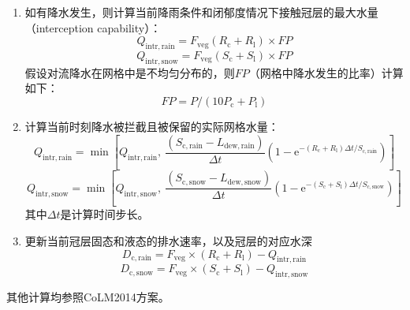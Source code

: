 \begin{enumerate}
\item 如有降水发生，则计算当前降雨条件和闭郁度情况下接触冠层的最大水量（interception capability）：
  \begin{equation}
    Q_{\mathrm{intr,rain}} =F_{\mathrm{veg}}\left(R_{\mathrm{c}}+R_{\mathrm{l}}\right)\times FP
  \end{equation}
  \begin{equation}
    Q_{\mathrm{intr,snow}} =F_{\mathrm{veg}}\left(S_{\mathrm{c}}+S_{\mathrm{l}}\right)\times FP
  \end{equation}
  假设对流降水在网格中是不均匀分布的，则$FP$（网格中降水发生的比率）计算如下：
  \begin{equation}
    FP = P/ (10P_{\mathrm{c}} + P_{\mathrm{l}})
  \end{equation}
\item 计算当前时刻降水被拦截且被保留的实际网格水量：
  \begin{equation}
    Q_{\mathrm{intr,rain}} = \min\left[Q_{\mathrm{intr,rain}}, \ \frac{(S_{\mathrm{c,rain}} - L_{\mathrm{dew,rain}})}{\Delta{t}}  (1-{\mathrm e}^{-\left(R_{\mathrm{c}}+R_{\mathrm{l}}\right)\Delta{t}/S_{\mathrm{c,rain}}})\right]
  \end{equation}
  \begin{equation}
    Q_{\mathrm{intr,snow}} = \min\left[Q_{\mathrm{intr,snow}},\ \frac{(S_{\mathrm{c,snow}} - L_{\mathrm{dew,snow}})}{\Delta{t}} (1-{\mathrm e}^{-\left(S_{\mathrm{c}}+S_{\mathrm{l}}\right)\Delta{t}/S_{\mathrm{c,snow}}})\right]
  \end{equation}
  其中${\Delta{t}}$是计算时间步长。
\item 更新当前冠层固态和液态的排水速率，以及冠层的对应水深
  \begin{equation}
    D_{\mathrm{c,rain}}=F_{\mathrm{veg}} \times (R_{\mathrm{c}}+R_{\mathrm{l}})-Q_{\mathrm{intr,rain}}
  \end{equation}
  \begin{equation}
    D_{\mathrm{c,snow}}=F_{\mathrm{veg}} \times (S_{\mathrm{c}}+S_{\mathrm{l}})-Q_{\mathrm{intr,snow}}
  \end{equation}
\end{enumerate}
其他计算均参照CoLM2014方案。


